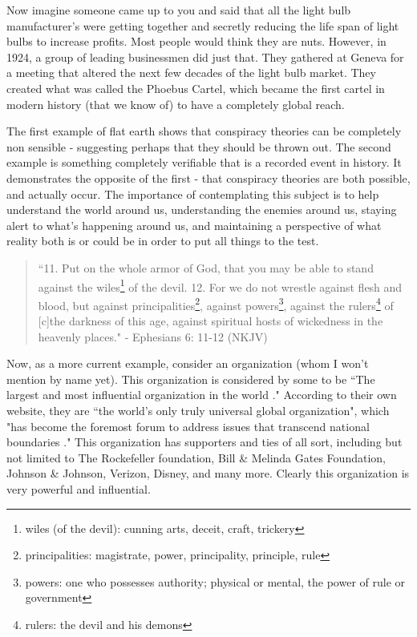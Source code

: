 \documentclass[9.5pt]{article}
\begin{document}
\begin{multicols}{2}
Now imagine someone came up to you and said that all the light bulb manufacturer's were getting together and secretly reducing the life span of light bulbs to increase profits. Most people would think they are nuts. However, in 1924, a group of leading businessmen did just that. They gathered at Geneva for a meeting that altered the next few decades of the light bulb market. They created what was called the Phoebus Cartel, which became the first cartel in modern history (that we know of) to have a completely global reach\cite{lightbulbConspiracy}. 

The first example of flat earth shows that conspiracy theories can be completely non sensible - suggesting perhaps that they should be thrown out. The second example is something completely verifiable that is a recorded event in history. It demonstrates the opposite of the first - that conspiracy theories are both possible, and actually occur. The importance of contemplating this subject is to help understand the world around us, understanding the enemies around us, staying alert to what's happening around us, and maintaining a perspective of what reality both is or could be in order to put all things to the test.

\begin{quotation}
``11. Put on the whole armor of God, that you may be able to stand against the wiles\footnote{wiles (of the devil): cunning arts, deceit, craft, trickery} of the devil. 12. For we do not wrestle against flesh and blood, but against principalities\footnote{principalities: magistrate, power, principality, principle, rule}, against powers\footnote{powers: one who possesses authority; physical or mental, the power of rule or government}, against the rulers\footnote{rulers: the devil and his demons} of [c]the darkness of this age, against spiritual hosts of wickedness in the heavenly places." - Ephesians 6: 11-12 (NKJV)
\end{quotation}

Now, as a more current example, consider an organization (whom I won't mention by name yet). This organization is considered by some to be ``The largest and most influential organization in the world \cite{Oakridge}." According to their own website, they are ``the world’s only truly universal global organization", which "has become the foremost forum to address issues that transcend national boundaries \cite{UNPreamble}." This organization has supporters and ties of all sort, including but not limited to The Rockefeller foundation, Bill \& Melinda Gates Foundation, Johnson \& Johnson, Verizon, Disney, and many more. Clearly this organization is very powerful and influential. 


\end{multicols}
\end{document}
